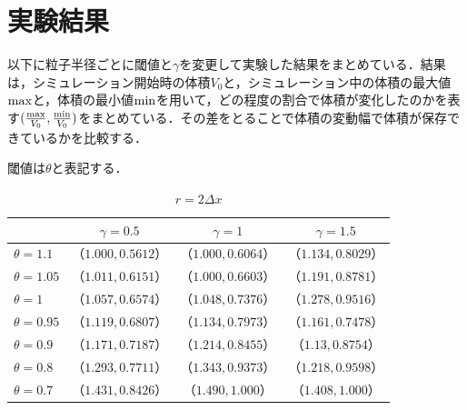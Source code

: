 \documentclass[a4j,12pt]{jreport}
\begin{document}
\section{実験結果} \label{sec:exp_result}
以下に粒子半径ごとに閾値と$\gamma$を変更して実験した結果をまとめている．結果は，シミュレーション開始時の体積$V_0$と，シミュレーション中の体積の最大値$\rm{max}$と，体積の最小値$\rm{min}$を用いて，どの程度の割合で体積が変化したのかを表す$(\frac{\rm{max}}{V_0},\frac{\rm{min}}{V_0})$をまとめている．その差をとることで体積の変動幅で体積が保存できているかを比較する．

閾値は$\theta$と表記する．
\begin{table}[H]
    \centering
    \caption{$r = 2\varDelta x$} \label{table:r2dx}
    \begin{tabular}{|l|c|c|c|}
    \hline
                			 	& $\gamma = 0.5$	 	& $\gamma =1$ 	 & $\gamma =1.5$ 		\\\hline\hline
     $\theta = 1.1$        & $（1.000,0.5612）$ & $（1.000,0.6064）$ & $（1.134,0.8029）$ 			\\
     $\theta = 1.05$      & $（1.011,0.6151）$ & $（1.000,0.6603）$ & $（1.191,0.8781）$                  \\
     $\theta = 1$   	 & $（1.057,0.6574）$ & $（1.048,0.7376）$ & $（1.278,0.9516）$        \\
     $\theta = 0.95$      & $（1.119,0.6807）$ & $（1.134,0.7973）$ & $（1.161,0.7478）$ \\
     $\theta = 0.9$  	 & $（1.171,0.7187）$ & $（1.214,0.8455）$ & $（1.13,0.8754）$     \\
     $\theta = 0.8$      & $（1.293,0.7711）$ & $（1.343,0.9373）$ & $（1.218,0.9598）$ \\                
     $\theta = 0.7$      & $（1.431,0.8426）$ & $（1.490,1.000）$ & $（1.408,1.000）$ \\ \hline
    \end{tabular}
  \end{table}
  
\end{document}
